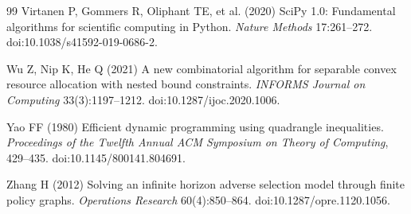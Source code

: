 \begin{thebibliography}{99}
Virtanen P, Gommers R, Oliphant TE, et al. (2020) SciPy 1.0: Fundamental algorithms for scientific computing in Python. \emph{Nature Methods} 17:261--272. doi:10.1038/s41592-019-0686-2.

Wu Z, Nip K, He Q (2021) A new combinatorial algorithm for separable convex resource allocation with nested bound constraints. \emph{INFORMS Journal on Computing} 33(3):1197--1212. doi:10.1287/ijoc.2020.1006.

Yao FF (1980) Efficient dynamic programming using quadrangle inequalities. \emph{Proceedings of the Twelfth Annual ACM Symposium on Theory of Computing}, 429--435. doi:10.1145/800141.804691.

Zhang H (2012) Solving an infinite horizon adverse selection model through finite policy graphs. \emph{Operations Research} 60(4):850--864. doi:10.1287/opre.1120.1056.
\end{thebibliography}
